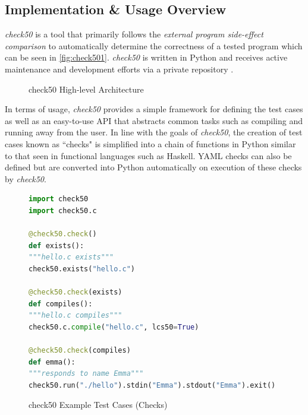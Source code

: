 \documentclass[hidelinks]{report}
\begin{document}
\subsection{Implementation \& Usage Overview}

\textit{check50} is a tool that primarily follows the \textit{external program side-effect comparison} to automatically determine the correctness of a tested program which can be seen in \autoref{fig:check501}. \textit{check50} is written in Python and receives active maintenance and development efforts via a private repository \cite{check50Github}.

\begin{figure}[h]
	\centering
	\caption{check50 High-level Architecture}
	\label{fig:check501}
\end{figure}

In terms of usage, \textit{check50} provides a simple framework for defining the test cases as well as an easy-to-use API that abstracts common tasks such as compiling and running away from the user. In line with the goals of \textit{check50}, the creation of test cases known as ``checks" is simplified into a chain of functions in Python similar to that seen in functional languages such as Haskell. YAML checks can also be defined but are converted into Python automatically on execution of these checks by \textit{check50}.

\begin{figure}[h]
	\centering
	\begin{lstlisting}[language=python, breaklines=true, linewidth=\linewidth]
import check50
import check50.c

@check50.check()
def exists():
"""hello.c exists"""
check50.exists("hello.c")

@check50.check(exists)
def compiles():
"""hello.c compiles"""
check50.c.compile("hello.c", lcs50=True)

@check50.check(compiles)
def emma():
"""responds to name Emma"""
check50.run("./hello").stdin("Emma").stdout("Emma").exit()
	\end{lstlisting}
	\caption{check50 Example Test Cases (Checks)}
	\label{fig:check502}
\end{figure}
\end{document}
